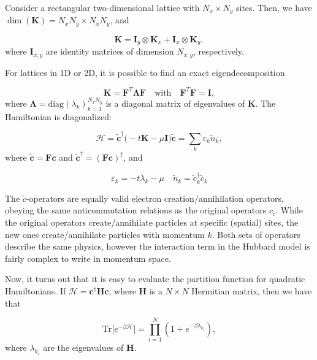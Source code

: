 \documentclass[10pt, twocolumn, twoside]{article}
\begin{document}
Consider a rectangular two-dimensional lattice with $N_x \times N_y$ sites. Then, we have $\dim(\bm K) = N_x N_y \times N_x N_y $, and

\begin{equation}
\bm K = \bm I_y \otimes \bm K_x + \bm I_x \otimes \bm K_y ,
\end{equation}
where $\bm I_{x, y}$ are identity matrices of dimension $N_{x, y}$, respectively.

For lattices in 1D or 2D, it is possible to find an exact eigendecomposition

\begin{equation}
\bm K = \bm F^T \bm \Lambda \bm F \quad \text{with}  \quad \bm F^T \bm F = \bm I ,
\end{equation}
where $\bm \Lambda = \text{diag}(\lambda_k)_{k = 1}^{N_x N_y}$ is a diagonal matrix of eigenvalues of $\bm K$. The Hamiltonian is diagonalized:

\begin{equation}\label{eq:quadraticH}
\mathcal{H} =\tilde{\bm c}^\dagger \big( -t \bm K - \mu \bm I \big) \tilde{\bm c} = \sum_k \varepsilon_k \tilde{n}_k ,
\end{equation}
where $\tilde{\bm c} = \bm F \bm c$ and $\tilde{\bm c}^\dagger = (\bm F \bm c)^\dagger$, and

\begin{equation}
\varepsilon_k = -t \lambda_k - \mu \quad \tilde{n}_k = \tilde{c}_k^\dagger \tilde{c}_k
\end{equation}

The $\tilde{c}$-operators are equally valid electron creation/annihilation operators, obeying the same anticommutation relations as the original operators $c_i$. While the original operators create/annihilate particles at specific (spatial) sites, the new ones create/annihilate particles with momentum $k$. Both sets of operators describe the same physics, however the interaction term in the Hubbard model is fairly complex to write in momentum space.

\bigskip

Now, it turns out that it is easy to evaluate the partition function for quadratic Hamiltonians. If $\mathcal{H} = \bm c^\dagger \bm H \bm c$, where $\bm H$ is a $N \times N$ Hermitian matrix, then we have that

\begin{equation}\label{eq:trace_quadratic}
\text{Tr} \big[ e^{-\beta \mathcal{H} } \big] = \prod_{i=1}^N ( 1 + e^{-\beta \lambda_{k_i} } ) ,
\end{equation}
where $\lambda_{k_i}$ are the eigenvalues of $\bm H$.
\end{document}
